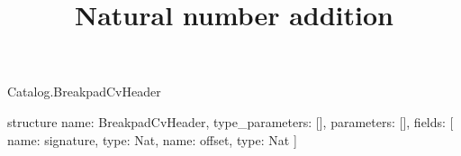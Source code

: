 \begin{lexlean}{Catalog.BreakpadCvHeader}
\title{Natural number addition}
\begin{semanticmodule}
structure{
  name: BreakpadCvHeader,
  type_parameters: [],
  parameters: [],
  fields: [
    {name: signature, type: Nat},
    {name: offset, type: Nat}
  ]
}
\end{semanticmodule}
\end{lexlean}
